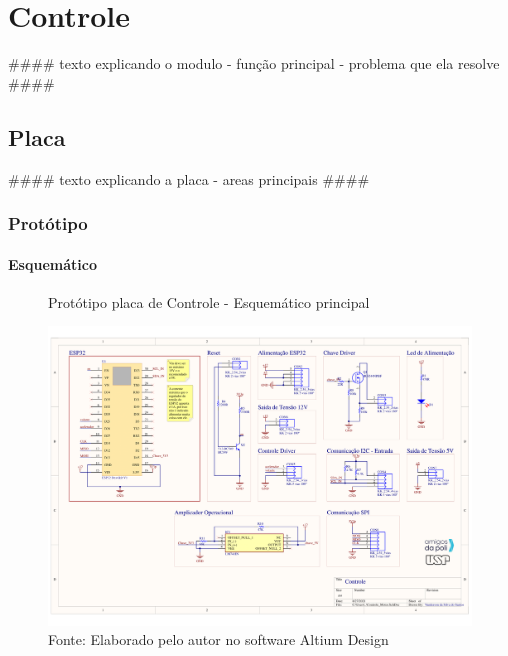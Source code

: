 \documentclass[../delivery_hospital_report.tex]{subfiles}
\begin{document}
\section{Controle}
####
texto explicando o modulo
    - função principal
    - problema que ela resolve
####

\subsection{Placa}
####
texto explicando a placa
    - areas principais
####

\subsubsection{Protótipo}

\paragraph{Esquemático}

\begin{figure}[h]
\centering
    \caption{Protótipo placa de Controle - Esquemático principal }
    \centering %
    \includegraphics[width=17cm]{modulos/Controle_Motor-1.png}
    \caption*{Fonte: Elaborado pelo autor no software Altium Design\cite{altium21} }
    \label{Protótipo placa de ## - Esquemático principal}
\end{figure}

\blindtext
\end{document}
